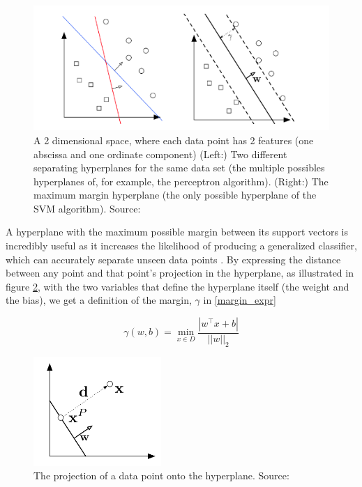 \begin{figure}
    \centering
    \includegraphics[width=0.75\linewidth]{images/hyperplane.png}
    \caption{A 2 dimensional space, where each data point has 2 features (one abscissa and one ordinate component) (Left:) Two different separating hyperplanes for the same data set (the multiple possibles hyperplanes of, for example, the perceptron algorithm). (Right:) The maximum margin hyperplane (the only possible hyperplane of the SVM algorithm). Source: \cite{cornell_svm_notes}}
    \label{fig:hyperplane}
\end{figure}

A hyperplane with the maximum possible margin between its support vectors is incredibly useful as it increases the likelihood of producing a generalized classifier, which can accurately separate unseen data points \cite{cornell_svm}. By expressing the distance between any point and that point's projection in the hyperplane, as illustrated in figure \ref{fig:hyperplane_geometry}, with the two variables that define the hyperplane itself (the weight and the bias), we get a definition of the margin, $\gamma$ in \ref{margin_expr} \cite{cornell_svm_notes}

\begin{equation}\label{margin_expr}
    \gamma(w,b)=\min_{x\in D} \frac{|w^\top x + b|}{||w||_{2}}
\end{equation}

\begin{figure}
    \centering
    \includegraphics[width=0.35\linewidth]{images/hyperplane_geometry.png}
    \caption{The projection of a data point onto the hyperplane. Source: \cite{cornell_svm_notes}}
    \label{fig:hyperplane_geometry}
\end{figure}

